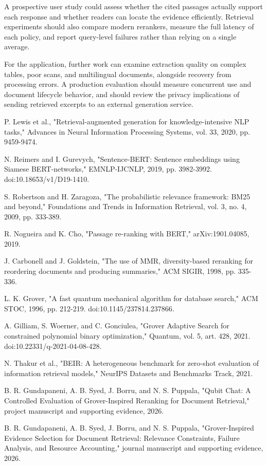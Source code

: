 \documentclass[11pt,a4paper]{article}
\newcommand{\reportheading}[1]{\par\vspace{4pt}{\large\bfseries #1}\par\vspace{1pt}}
\begin{document}
A prospective user study could assess whether the cited passages actually support each response and whether readers can locate the evidence efficiently. Retrieval experiments should also compare modern rerankers, measure the full latency of each policy, and report query-level failures rather than relying on a single average.

For the application, further work can examine extraction quality on complex tables, poor scans, and multilingual documents, alongside recovery from processing errors. A production evaluation should measure concurrent use and document lifecycle behavior, and should review the privacy implications of sending retrieved excerpts to an external generation service.

\reportheading{References}
{\raggedright\fontsize{10.3}{11.7}\selectfont [1] P. Lewis et al., "Retrieval-augmented generation for knowledge-intensive NLP tasks," Advances in Neural Information Processing Systems, vol. 33, 2020, pp. 9459-9474.\par}
{\raggedright\fontsize{10.3}{11.7}\selectfont [2] N. Reimers and I. Gurevych, "Sentence-BERT: Sentence embeddings using Siamese BERT-networks," EMNLP-IJCNLP, 2019, pp. 3982-3992. doi:10.18653/v1/D19-1410.\par}
{\raggedright\fontsize{10.3}{11.7}\selectfont [3] S. Robertson and H. Zaragoza, "The probabilistic relevance framework: BM25 and beyond," Foundations and Trends in Information Retrieval, vol. 3, no. 4, 2009, pp. 333-389.\par}
{\raggedright\fontsize{10.3}{11.7}\selectfont [4] R. Nogueira and K. Cho, "Passage re-ranking with BERT," arXiv:1901.04085, 2019.\par}
{\raggedright\fontsize{10.3}{11.7}\selectfont [5] J. Carbonell and J. Goldstein, "The use of MMR, diversity-based reranking for reordering documents and producing summaries," ACM SIGIR, 1998, pp. 335-336.\par}
{\raggedright\fontsize{10.3}{11.7}\selectfont [6] L. K. Grover, "A fast quantum mechanical algorithm for database search," ACM STOC, 1996, pp. 212-219. doi:10.1145/237814.237866.\par}
{\raggedright\fontsize{10.3}{11.7}\selectfont [7] A. Gilliam, S. Woerner, and C. Gonciulea, "Grover Adaptive Search for constrained polynomial binary optimization," Quantum, vol. 5, art. 428, 2021. doi:10.22331/q-2021-04-08-428.\par}
{\raggedright\fontsize{10.3}{11.7}\selectfont [8] N. Thakur et al., "BEIR: A heterogeneous benchmark for zero-shot evaluation of information retrieval models," NeurIPS Datasets and Benchmarks Track, 2021.\par}
{\raggedright\fontsize{10.3}{11.7}\selectfont [9] B. R. Gundapaneni, A. B. Syed, J. Borru, and N. S. Puppala, "Qubit Chat: A Controlled Evaluation of Grover-Inspired Reranking for Document Retrieval," project manuscript and supporting evidence, 2026.\par}
{\raggedright\fontsize{10.3}{11.7}\selectfont [10] B. R. Gundapaneni, A. B. Syed, J. Borru, and N. S. Puppala, "Grover-Inspired Evidence Selection for Document Retrieval: Relevance Constraints, Failure Analysis, and Resource Accounting," journal manuscript and supporting evidence, 2026.\par}
\end{document}
